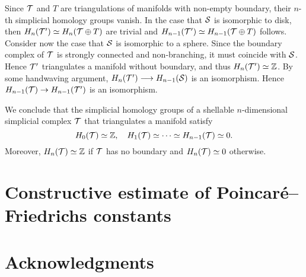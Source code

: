 \documentclass[a4paper]{amsart}
\begin{document}
\begin{remark}
    Since ${\mathcal T}$ and $T$ are triangulations of manifolds with non-empty boundary, their $n$-th simplicial homology groups vanish. 
    In the case that ${\mathcal S}$ is isomorphic to disk,
    then $H_{n}({\mathcal T}') \simeq H_{n}({\mathcal T} \oplus T)$ are trivial and $H_{n-1}({\mathcal T}') \simeq H_{n-1}({\mathcal T} \oplus T)$ follows.
    Consider now the case that ${\mathcal S}$ is isomorphic to a sphere.
    Since the boundary complex of ${\mathcal T}$ is strongly connected and non-branching, it must coincide with ${\mathcal S}$. Hence ${\mathcal T}'$ triangulates a manifold without boundary, and thus $H_{n}({\mathcal T}') \simeq {\mathbb Z}$. 
    \color{red}By some handwaving argument, $H_{n}({\mathcal T}') \longrightarrow H_{n-1}({\mathcal S})$ is an isomorphism.\color{black}
    Hence $H_{n-1}({\mathcal T}) \rightarrow H_{n-1}({\mathcal T}')$ is an isomorphism.
    
    We conclude that the simplicial homology groups of a shellable $n$-dimensional simplicial complex ${\mathcal T}$ that triangulates a manifold satisfy 
    \[
        H_0({\mathcal T}) \simeq {\mathbb Z}, 
        \quad 
        H_1({\mathcal T}) \simeq \dots \simeq H_{n-1}({\mathcal T}) \simeq 0.
    \]
    Moreover, $H_n({\mathcal T}) \simeq {\mathbb Z}$ if ${\mathcal T}$ has no boundary and $H_n({\mathcal T}) \simeq 0$ otherwise. 
    
\end{remark}


\section{Constructive estimate of Poincar\'e--Friedrichs constants}

\section*{Acknowledgments}



\end{document}
